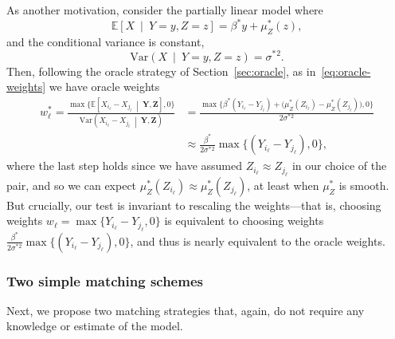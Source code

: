 \documentclass[12pt]{article}
\newcommand{\EEst}[2]{\mathbb{E}\left[{#1}\  \middle| \ {#2}\right]}
\newcommand{\VVst}[2]{\mathrm{Var}\left({#1}\  \middle| \ {#2}\right)}
\newcommand{\bY}{\mathbf{Y}}
\newcommand{\bZ}{\mathbf{Z}}
\begin{document}
As another motivation, consider the partially linear model where 
\[
\EEst{X}{Y=y,Z=z} = \beta^*y + \mu^*_Z(z),
\]
and the conditional variance is constant,
\[\VVst{X}{Y=y,Z=z} = \sigma^*{}^2.\]
Then, following the oracle strategy of Section~\ref{sec:oracle}, as in~\eqref{eq:oracle-weights} we have
oracle weights 
\begin{align*}
    w^*_\ell = \frac{\max\{\EEst{X_{i_\ell}-X_{j_\ell}}{\bY,\bZ},0\}}{\VVst{X_{i_\ell}-X_{j_\ell}}{\bY,\bZ}} &=  \frac{\max\bigl\{\beta^*(Y_{i_\ell}-Y_{j_\ell}) + \bigl(\mu^*_Z(Z_{i_\ell}) - \mu^*_Z(Z_{j_\ell})\bigr),0\bigr\}}{2\sigma^*{}^2}\\ &\approx  \frac{\beta^*}{2\sigma^*{}^2} \max\bigl\{(Y_{i_\ell}-Y_{j_\ell}),0\bigr\},
\end{align*}
where the last step holds since we have assumed $Z_{i_\ell}\approx Z_{j_\ell}$ in our choice of the pair, and so we can expect $\mu^*_Z(Z_{i_\ell}) \approx \mu^*_Z(Z_{j_\ell})$, at least when $\mu_Z^*$ is smooth.  But crucially, our test is invariant to rescaling the weights---that is, choosing weights $w_\ell = \max\bigl\{Y_{i_\ell} - Y_{j_\ell},0\bigr\}$ is equivalent to choosing weights $\frac{\beta^*}{2\sigma^*{}^2} \max\bigl\{(Y_{i_\ell}-Y_{j_\ell}),0\bigr\}$, and thus is nearly equivalent to the oracle weights.

\subsubsection{Two simple matching schemes}
Next, we propose two matching strategies that, again, do not require any knowledge or estimate of the model.
\end{document}

